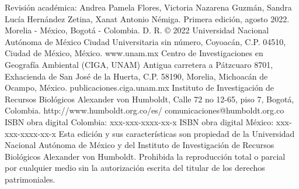 \begin{multicols*}{2}
{    \linebreak
    \newline Revisión académica: Andrea Pamela Flores, Victoria Nazarena Guzmán, Sandra Lucía Hernández Zetina, Xanat Antonio Némiga. \hspace*{\fill}
    \linebreak
    \newline Primera edición, agosto 2022. Morelia - México, Bogotá - Colombia.  
    D. R. © 2022 Universidad Nacional Autónoma de México 
    Ciudad Universitaria sin número, Coyoacán, C.P. 04510, Ciudad de México, México.
    www.unam.mx
    \newline Centro de Investigaciones en Geografía Ambiental (CIGA, UNAM) 
    Antigua carretera a Pátzcuaro 8701, Exhacienda de San José de la Huerta, C.P. 58190, Morelia, Michoacán de Ocampo, México.
    publicaciones.ciga.unam.mx
    \newline Instituto de Investigación de Recursos Biológicos
    Alexander von Humboldt, Calle 72 no 12-65, piso 7, Bogotá,
    Colombia. http://www.humboldt.org.co/es/
    comunicaciones@humboldt.org.co
    \newline ISBN obra digital Colombia: xxx-xxx-xxxx-xx-x \hspace*{\fill}
    \newline ISBN obra digital México: xxx-xxx-xxxx-xx-x \hspace*{\fill}
    \linebreak
    \newline Esta edición y sus características son propiedad de la Universidad Nacional Autónoma de México y del Instituto de Investigación de Recursos Biológicos Alexander von Humboldt. Prohibida la reproducción total o parcial por cualquier medio sin la autorización escrita del titular de los derechos patrimoniales.}
\end{multicols*}
\vspace*{\fill}

\let\maketitle\oldmaketitle
\maketitle
